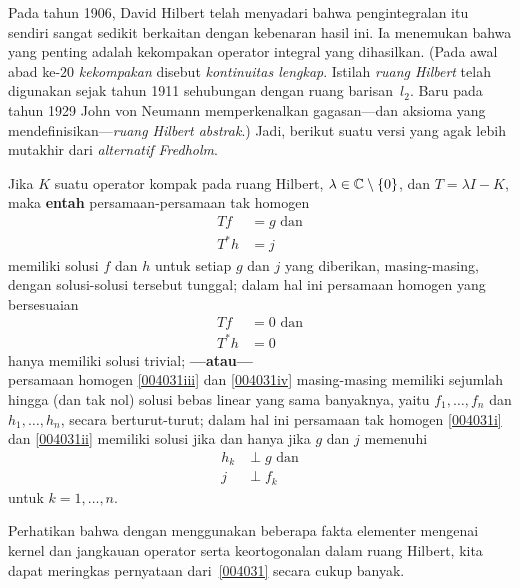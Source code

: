 Pada tahun 1906, David Hilbert telah menyadari bahwa pengintegralan itu sendiri sangat sedikit berkaitan dengan
kebenaran hasil ini. Ia menemukan bahwa yang penting adalah kekompakan
operator integral yang dihasilkan. (Pada awal abad ke-$20$
\emph{kekompakan} disebut \emph{kontinuitas lengkap}. Istilah \emph{ruang Hilbert}
telah digunakan sejak tahun 1911 sehubungan dengan ruang barisan~$l_2$. Baru pada
tahun 1929 John von Neumann memperkenalkan gagasan---dan aksioma yang
mendefinisikan---\emph{ruang Hilbert abstrak}.) Jadi, berikut suatu versi yang agak lebih mutakhir dari
\emph{alternatif Fredholm}.

\begin{prop}\label{004031} Jika $K$ suatu operator kompak pada ruang
Hilbert, $\lambda \in \mathbb{C}\setminus\{0\}$, dan $T = \lambda I - K$, maka \textbf{entah} persamaan-persamaan
tak homogen
 \begin{align}
            Tf &= g\label{004031i} \text{ dan} \tag{1'}\\
            T^* h &= j\label{004031ii} \tag{2'}
 \end{align}
memiliki solusi $f$ dan $h$ untuk setiap $g$ dan $j$ yang diberikan, masing-masing, dengan solusi-solusi tersebut
tunggal; dalam hal ini persamaan homogen yang bersesuaian
 \begin{align}
            Tf &= 0\label{004031iii} \text{ dan} \tag{3'}\\
          T^*h &= 0\label{004031iv} \tag{4'}
 \end{align}
hanya memiliki solusi trivial; \textbf{---atau---}\\
persamaan homogen \eqref{004031iii} dan \eqref{004031iv} masing-masing memiliki
sejumlah hingga (dan tak nol) solusi bebas linear yang sama banyaknya, yaitu $f_1,\dots,f_n$ dan $h_1,\dots,h_n$,
secara berturut-turut; dalam hal ini persamaan tak homogen \eqref{004031i} dan
\eqref{004031ii} memiliki solusi jika dan hanya jika $g$ dan $j$ memenuhi
 \begin{align} h_k &\perp g\label{004031v} \text{ dan} \tag{5'}\\
                 j &\perp f_k\label{004031vi} \tag{6'}
 \end{align}
untuk $k = 1, \dots, n$.
\end{prop}

Perhatikan bahwa dengan menggunakan beberapa fakta elementer mengenai kernel dan jangkauan
operator serta keortogonalan dalam ruang Hilbert, kita dapat meringkas pernyataan
dari~\ref{004031} secara cukup banyak.


